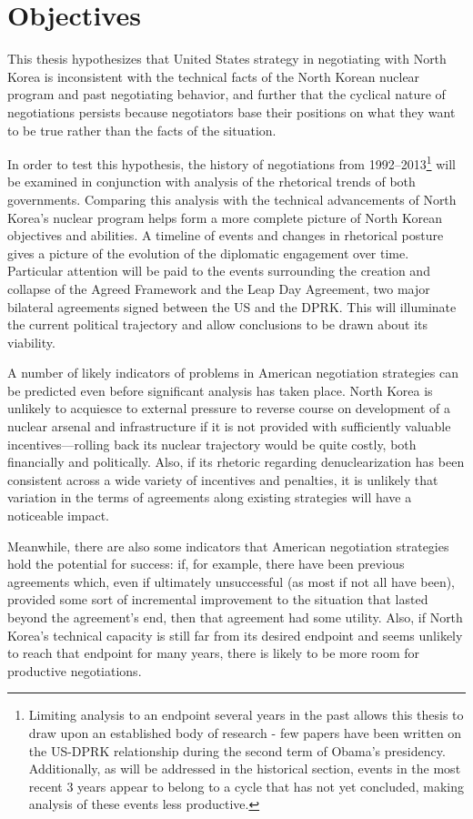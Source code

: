 \section*{Objectives}

This thesis hypothesizes that United States strategy in negotiating with North Korea is inconsistent with the technical facts of the North Korean nuclear program and past negotiating behavior, and further that the cyclical nature of negotiations persists because negotiators base their positions on what they want to be true rather than the facts of the situation. 

In order to test this hypothesis, the history of negotiations from 1992--2013\footnote{Limiting analysis to an endpoint several years in the past allows this thesis to draw upon an established body of research - few papers have been written on the US-DPRK relationship during the second term of Obama's presidency. Additionally, as will be addressed in the historical section, events in the most recent 3 years appear to belong to a cycle that has not yet concluded, making analysis of these events less productive.} will be examined in conjunction with analysis of the rhetorical trends of both governments. Comparing this analysis with the technical advancements of North Korea's nuclear program helps form a more complete picture of North Korean objectives and abilities. A timeline of events and changes in rhetorical posture gives a picture of the evolution of the diplomatic engagement over time. Particular attention will be paid to the events surrounding the creation and collapse of the Agreed Framework and the Leap Day Agreement, two major bilateral agreements signed between the US and the DPRK. This will illuminate the current political trajectory and allow conclusions to be drawn about its viability.

A number of likely indicators of problems in American negotiation strategies can be predicted even before significant analysis has taken place. North Korea is unlikely to acquiesce to external pressure to reverse course on development of a nuclear arsenal and infrastructure if it is not provided with sufficiently valuable incentives---rolling back its nuclear trajectory would be quite costly, both financially and politically. Also, if its rhetoric regarding denuclearization has been consistent across a wide variety of incentives and penalties, it is unlikely that variation in the terms of agreements along existing strategies will have a noticeable impact.

Meanwhile, there are also some indicators that American negotiation strategies hold the potential for success: if, for example, there have been previous agreements which, even if ultimately unsuccessful (as most if not all have been), provided some sort of incremental improvement to the situation that lasted beyond the agreement's end, then that agreement had some utility. Also, if North Korea's technical capacity is still far from its desired endpoint and seems unlikely to reach that endpoint for many years, there is likely to be more room for productive negotiations.


